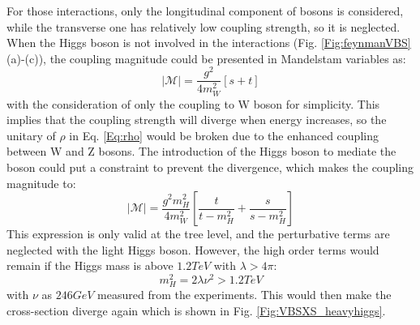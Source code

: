 For those interactions, only the longitudinal component of bosons is considered, while the transverse one has relatively low coupling strength, so it is neglected. When the Higgs boson is not involved in the interactions (Fig. \ref{Fig:feynmanVBS} (a)-(c)), the coupling magnitude could be presented in Mandelstam variables as:
\begin{equation}
|\mathcal{M}|=\frac{g^2}{4m_{W}^{2}}\left[s+t\right]
\end{equation}
with the consideration of only the coupling to W boson for simplicity. This implies that the coupling strength will diverge when energy increases, so the unitary of $\rho$ in Eq. \ref{Eq:rho} would be broken due to the enhanced coupling between W and Z bosons. The introduction of the Higgs boson to mediate the boson could put a constraint to prevent the divergence, which makes the coupling magnitude to:
\begin{equation}
|\mathcal{M}|=\frac{g^2m_{H}^2}{4m_{W}^{2}}\left[\frac{t}{t-m_{H}^{2}}+\frac{s}{s-m_{H}^{2}}\right]
\end{equation} 
This expression is only valid at the tree level, and the perturbative terms are neglected with the light Higgs boson. However, the high order terms would remain if the Higgs mass is above $1.2TeV$ with $\lambda > 4\pi$:
\begin{equation}
m^2_{H}=2\lambda\nu^2 > 1.2TeV
\end{equation}
with $\nu$ as $246GeV$ measured from the experiments. This would then make the cross-section diverge again which is shown in Fig. \ref{Fig:VBSXS_heavyhiggs}. 

